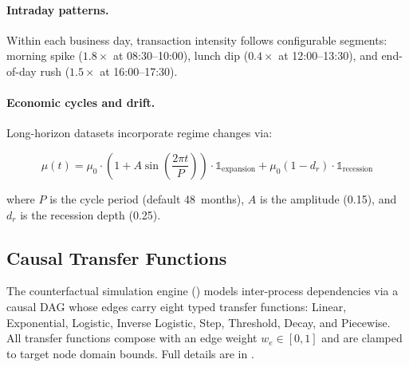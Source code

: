 \paragraph{Intraday patterns.}
Within each business day, transaction intensity follows configurable
segments: morning spike ($1.8\times$ at 08:30--10:00), lunch dip
($0.4\times$ at 12:00--13:30), and end-of-day rush ($1.5\times$ at
16:00--17:30).

\paragraph{Economic cycles and drift.}
Long-horizon datasets incorporate regime changes via:

\begin{equation}
\mu(t) = \mu_0 \cdot \left(1 + A\sin\!\left(\frac{2\pi t}{P}\right)\right)
  \cdot \mathbb{1}_{\text{expansion}}
  + \mu_0(1 - d_r) \cdot \mathbb{1}_{\text{recession}}
\label{eq:drift}
\end{equation}

where $P$ is the cycle period (default 48~months), $A$ is the amplitude
(0.15), and $d_r$ is the recession depth (0.25).

\subsection{Causal Transfer Functions}
\label{sec:stat_transfer_functions}

The counterfactual simulation engine () models
inter-process dependencies via a causal DAG whose edges carry eight
typed transfer functions: Linear, Exponential, Logistic, Inverse
Logistic, Step, Threshold, Decay, and Piecewise.  All transfer functions
compose with an edge weight $w_e \in [0,1]$ and are clamped to target
node domain bounds.  Full details are in .
